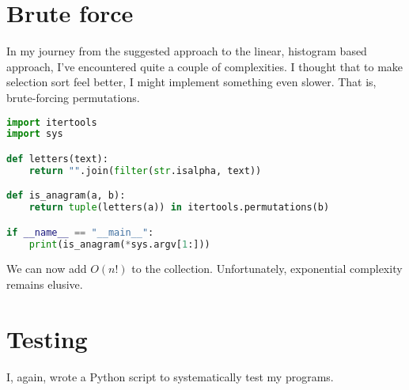 \documentclass{article}
\begin{document}
    \section{Brute force}

    In my journey from the suggested approach to the linear, histogram based
    approach, I've encountered quite a couple of complexities. I thought that
    to make selection sort feel better, I might implement something even
    slower. That is, brute-forcing permutations.

\begin{lstlisting}[language=Python, caption=Brute force]
import itertools
import sys

def letters(text):
    return "".join(filter(str.isalpha, text))

def is_anagram(a, b):
    return tuple(letters(a)) in itertools.permutations(b)

if __name__ == "__main__":
    print(is_anagram(*sys.argv[1:]))
\end{lstlisting}

    We can now add $O(n!)$ to the collection. Unfortunately, exponential
    complexity remains elusive.

    \section{Testing}

    I, again, wrote a Python script to systematically test my programs.
\end{document}
